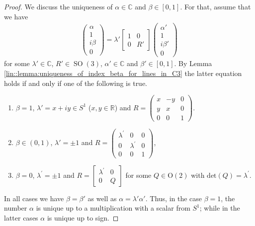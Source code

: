 \documentclass{amsart}
\newcommand{\R}{\mathbb{R}}
\newcommand{\C}{\mathbb{C}}
\DeclareMathOperator{\SO}{SO}
\begin{document}
\begin{proof}
    We discuss the uniqueness of $\alpha \in \C$ and $\beta \in [0,1]$. For that, assume that we have
    \begin{align*}
        \begin{pmatrix}
            \alpha \\ 1 \\ i \beta \\ 0
        \end{pmatrix}
        =\lambda'
        \left[\begin{array}{c|c}
            1 & 0 \\
            \hline
            0 & R'
            \end{array}\right]
        \begin{pmatrix}
            \alpha' \\ 1 \\ i \beta' \\ 0
        \end{pmatrix}
    \end{align*}
    for some $\lambda'\in\C$, $R'\in\SO(3)$, $\alpha'\in\C$ and $\beta'\in[0,1]$.
    By Lemma \ref{lin::lemma:uniqueness_of_index_beta_for_lines_in_C3} the latter equation holds if and only if one of the following is true.
    \begin{enumerate}[label=(\alph*)]
        \item $\beta=1$, $\lambda'=x+iy\in S^1$ ($x,y\in\R$) and 
        $\displaystyle R=\begin{pmatrix}x&-y&0\\y&x&0\\0&0&1\end{pmatrix}$.
        \item $\beta\in(0,1)$, $\lambda' = \pm 1$  and $\displaystyle R = \begin{pmatrix}
            \lambda^\prime & 0 & 0 \\
            0 & \lambda^\prime & 0 \\
            0 & 0 & 1
        \end{pmatrix}$,
        \item $\beta=0$, $\lambda^\prime = \pm 1$ and $\displaystyle R = \left[\begin{array}{c|c}
            \lambda^\prime & 0 \\ \hline
            0 & Q
        \end{array}\right]$ for some $Q \in \mathrm{O}(2)$ with $\mathrm{det}(Q) = \lambda^\prime$.
    \end{enumerate}
    In all cases we have $\beta=\beta'$ as well as $\alpha=\lambda'\alpha'$. Thus, in the case $\beta=1$, the number $\alpha$ is unique up to a multiplication with a scalar from $S^1$; while in the latter cases $\alpha$ is unique up to sign.


\end{proof}
\end{document}
